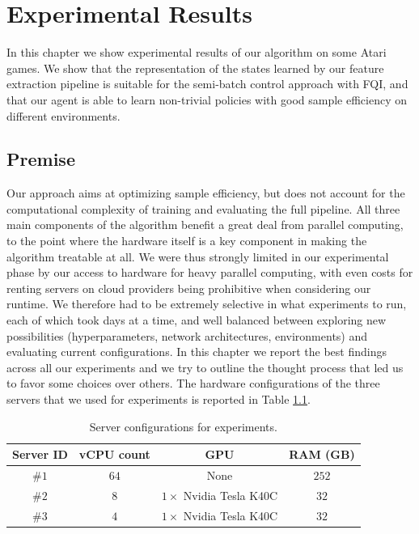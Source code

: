 \chapter{Experimental Results}
\label{chapter6_experiments}
\thispagestyle{empty}

\vspace{0.5cm}

In this chapter we show experimental results of our algorithm on some Atari
games.
We show that the representation of the states learned by our feature extraction 
pipeline is suitable for the semi-batch control approach with FQI, and that 
our agent is able to learn non-trivial policies with good sample efficiency on 
different environments.

\section{Premise}
Our approach aims at optimizing sample efficiency, but does not account for
the computational complexity of training and evaluating the full pipeline. 
All three main components of the algorithm benefit a great deal from parallel 
computing, to the point where the hardware itself is a key component in 
making the algorithm treatable at all. 
We were thus strongly limited in our experimental phase by our access to 
hardware for heavy parallel computing, with even costs for renting servers on 
cloud providers being prohibitive when considering our runtime. 
We therefore had to be extremely selective in what experiments to run, each of 
which took days at a time, and well balanced between exploring new possibilities
(hyperparameters, network architectures, environments) and evaluating current 
configurations. 
In this chapter we report the best findings across all our experiments and we 
try to outline the thought process that led us to favor some choices over others.
The hardware configurations of the three servers that we used for experiments is
reported in Table \ref{t:servers}. 
%
\begin{table}[t]
    \centering
    \begin{tabular}{c c c c} 
	\hline
	Server ID & vCPU count & GPU                          & RAM (GB) \\ 
	\hline 
	\#$1$     & $64$       & None                         & $252$ \\
	\#$2$     & $8$        & $1 \times$ Nvidia Tesla K40C & $32$ \\
	\#$3$     & $4$        & $1 \times$ Nvidia Tesla K40C & $32$ \\
	\hline
    \end{tabular}
    \caption[Server configurations for experiments]{Server configurations for 
	     experiments.}
    \label{t:servers}
\end{table}
%

